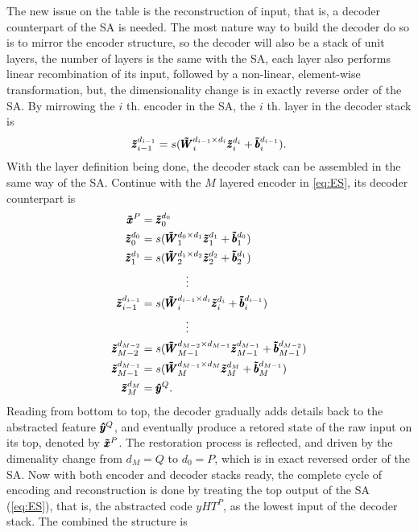 The new issue on the table is the reconstruction of input, that is, a decoder counterpart of the SA is needed. The most nature way to build the decoder do so is to mirror the encoder structure, so the decoder will also be a stack of unit layers, the number of layers is the same with the SA, each layer also performs linear recombination of its input, followed by a non-linear, element-wise transformation, but, the dimensionality change is in exactly reverse order of the SA. By mirrowing the $i$ th. encoder in the SA, the $i$ th. layer in the decoder stack is
\begin{equation*}
  {\pmb{\tilde{z}}_{i-1}^{d_{i-1}}} = s(\pmb{\tilde{W}}_{i  }^{d_{i-1} \times d_{i  }} {\pmb{\tilde{z}}_{i  }^{d_{i  }}} + \pmb{\tilde{b}}_{i  }^{d_{i-1}}).
\end{equation*}
 With the layer definition being done, the decoder stack can be assembled in the same way of the SA. Continue with the $M$ layered encoder in \ref{eq:ES}, its decoder counterpart is
\begin{equation} \label{eq:DS}
\begin{split}
  \pmb{\tilde{x}}^P &= {\pmb{\tilde{z}}_{0}^{d_{0}}} \\
  {\pmb{\tilde{z}}_{0  }^{d_{0  }}} &= s(\pmb{\tilde{W}}_{1  }^{d_{0  } \times d_{1  }} {\pmb{\tilde{z}}_{1  }^{d_{1  }}} + \pmb{\tilde{b}}_{1  }^{d_{0  }}) \\
  {\pmb{\tilde{z}}_{1  }^{d_{1  }}} &= s(\pmb{\tilde{W}}_{2  }^{d_{1  } \times d_{2  }} {\pmb{\tilde{z}}_{2  }^{d_{2  }}} + \pmb{\tilde{b}}_{2  }^{d_{1  }}) \\
  & \quad \quad \quad \quad \vdots \\
  {\pmb{\tilde{z}}_{i-1}^{d_{i-1}}} &= s(\pmb{\tilde{W}}_{i  }^{d_{i-1} \times d_{i  }} {\pmb{\tilde{z}}_{i  }^{d_{i  }}} + \pmb{\tilde{b}}_{i  }^{d_{i-1}}) \\
  & \quad \quad \quad \quad \vdots \\
  {\pmb{\tilde{z}}_{M-2}^{d_{M-2}}} &= s(\pmb{\tilde{W}}_{M-1}^{d_{M-2} \times d_{M-1}} {\pmb{\tilde{z}}_{M-1}^{d_{M-1}}} + \pmb{\tilde{b}}_{M-1}^{d_{M-2}}) \\
  {\pmb{\tilde{z}}_{M-1}^{d_{M-1}}} &= s(\pmb{\tilde{W}}_{M  }^{d_{M-1} \times d_{M  }} {\pmb{\tilde{z}}_{M  }^{d_{M  }}} + \pmb{\tilde{b}}_{M  }^{d_{M-1}}) \\
  {\pmb{\tilde{z}}_{M  }^{d_{M  }}} &= \pmb{\hat{y}}^Q .
\end{split}
\end{equation}
Reading from bottom to top, the decoder gradually adds details back to the abstracted feature $\pmb{\hat{y}}^Q$, and eventually produce a retored state of the raw input on its top, denoted by $\pmb{\tilde{x}}^P$. The restoration process is reflected, and driven by the dimenality change from $d_M = Q$ to $d_0 = P$, which is in exact reversed order of the SA. Now with both encoder and decoder stacks ready, the complete cycle of encoding and reconstruction is done by treating the top output of the SA (\ref{eq:ES}), that is, the abstracted code $yHT^P$, as the lowest input of the decoder stack. The combined the structure is
